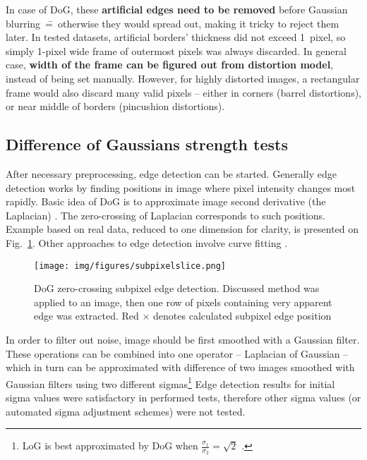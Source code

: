 In case of DoG, these \textbf{artificial edges need to be removed} before Gaussian blurring~\==~otherwise they would spread out, making it tricky to reject them later. In tested datasets, artificial borders' thickness did not exceed 1~pixel, so simply 1-pixel wide frame of outermost pixels was always discarded. In general case, \textbf{width of the frame can be figured out from distortion model}, instead of being set manually. However, for highly distorted images, a rectangular frame would also discard many valid pixels -- either in corners (barrel distortions), or near middle of borders (pincushion distortions).

\subsection{Difference of Gaussians strength tests}

After necessary preprocessing, edge detection can be started. Generally edge detection works by finding positions in image where pixel intensity changes most rapidly. Basic idea of DoG is to approximate image second derivative (the Laplacian) \cite{szeliski} \cite{jain1995machine}. The zero-crossing of Laplacian corresponds to such positions. Example based on real data, reduced to one dimension for clarity, is presented on Fig.~\ref{fig:slice}. Other approaches to edge detection involve curve fitting \cite{fabijanska} \cite{devernay1995non} \cite{wei2010two}.

\begin{figure}[ht]
	\centering\texttt{[image: img/figures/subpixelslice.png]}
	\caption{ DoG zero-crossing subpixel edge detection. Discussed method was applied to an image, then one row of pixels containing very apparent edge was extracted. Red $\times$ denotes calculated subpixel edge position }
	\label{fig:slice}
\end{figure}

In order to filter out noise, image should be first smoothed with a Gaussian filter. These operations can be combined into one operator -- Laplacian of Gaussian -- which in turn can be approximated with difference of two images smoothed with Gaussian filters using two different sigmas\footnote{LoG is best approximated by DoG when $\frac{\sigma_{1}}{\sigma_{2}} = \sqrt{2}$ \cite{sift}.} Edge detection results for initial sigma values were satisfactory in performed tests, therefore other sigma values (or automated sigma adjustment schemes) were not tested.

